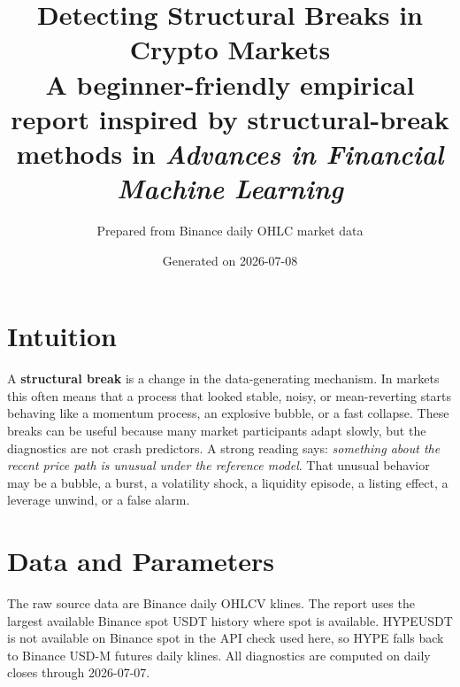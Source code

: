 \documentclass[11pt]{article}
\title{\Huge Detecting Structural Breaks in Crypto Markets\\[0.25em]
\Large A beginner-friendly empirical report inspired by structural-break methods in \emph{Advances in Financial Machine Learning}}
\author{Prepared from Binance daily OHLC market data}
\date{Generated on 2026-07-08}
\begin{document}
\maketitle

\begin{center}
\end{center}

\tableofcontents
\newpage

\section{Intuition}

A \textbf{structural break} is a change in the data-generating mechanism. In markets this often means that a process that looked stable, noisy, or mean-reverting starts behaving like a momentum process, an explosive bubble, or a fast collapse. These breaks can be useful because many market participants adapt slowly, but the diagnostics are not crash predictors. A strong reading says: \emph{something about the recent price path is unusual under the reference model}. That unusual behavior may be a bubble, a burst, a volatility shock, a liquidity episode, a listing effect, a leverage unwind, or a false alarm.

\section{Data and Parameters}

The raw source data are Binance daily OHLCV klines. The report uses the largest available Binance spot USDT history where spot is available. HYPEUSDT is not available on Binance spot in the API check used here, so HYPE falls back to Binance USD-M futures daily klines. All diagnostics are computed on daily closes through 2026-07-07.
\end{document}

